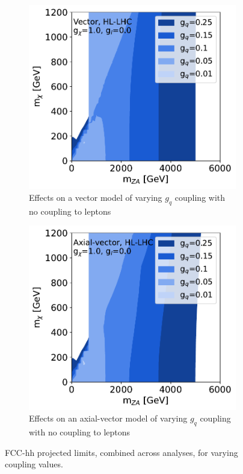 \documentclass[11pt]{article}
\begin{document}
\begin{figure}
     \centering
     \begin{subfigure}[b]{0.49\textwidth}
         \centering
         \includegraphics[width=\textwidth]{SummaryPlots-EF10/figures/massmass/hl-lhc/massmass_vector_gl0.0_gdm1.0.pdf}
         \caption{Effects on a vector model of varying $g_q$ coupling with no coupling to leptons}
         \label{subfig:vector-fcc-gqvariations1}
     \end{subfigure}
     \hfill
     \begin{subfigure}[b]{0.49\textwidth}
         \centering
         \includegraphics[width=\textwidth]{SummaryPlots-EF10/figures/massmass/hl-lhc/massmass_axial_gl0.0_gdm1.0.pdf}
         \caption{Effects on an axial-vector model of varying $g_q$ coupling with no coupling to leptons}
         \label{subfig:axial-fcc-gqvariations}
     \end{subfigure}
    \caption{FCC-hh projected limits, combined across analyses, for varying coupling values.}
    \label{fig:fcc-hh-massmass-combined}
\end{figure}
\end{document}
